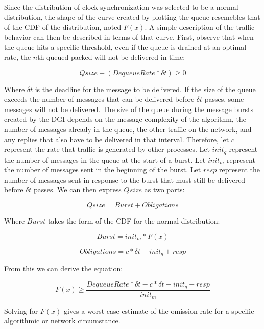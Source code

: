 Since the distribution of clock synchronization was selected to be a normal distribution, the shape of the curve created by plotting the queue resemebles that of the \ac{CDF} of the distribution, noted $F(x)$.
A simple description of the traffic behavior can then be described in terms of that curve.
First, observe that when the queue hits a specific threshold, even if the queue is drained at an optimal rate, the $n$th queued packed will not be delivered in time:

\begin{equation}
Qsize - (DequeueRate * \delta t) \geq 0
\end{equation}

Where $\delta t$ is the deadline for the message to be delivered.
If the size of the queue exceeds the number of messages that can be delivered before $\delta t$ passes, some messages will not be delivered.
The size of the queue during the message bursts created by the DGI depends on the message complexity of the algorithm, the number of messages already in the queue, the other traffic on the network, and any replies that also have to be delivered in that interval.
Therefore, let $c$ represent the rate that traffic is generated by other processes.
Let $init_q$ represent the number of messages in the queue at the start of a burst. 
Let $init_m$ represent the number of messages sent in the beginning of the burst.
Let $resp$ represent the number of messages sent in response to the burst that must still be delivered before $\delta t$ passes.
We can then express $Qsize$ as two parts:

\begin{equation}
Qsize = Burst + Obligations
\end{equation}

Where $Burst$ takes the form of the \ac{CDF} for the normal distribution:

\begin{equation}
Burst = init_m * F(x)  
\end{equation}

\begin{equation}
Obligations = c * \delta t + init_q + resp
\end{equation}

From this we can derive the equation:

\begin{equation}
F(x) \geq \frac{DequeueRate * \delta t - c * \delta t - init_q - resp}{init_m}
\end{equation}

Solving for $F(x)$ gives a worst case estimate of the omission rate for a specific algorithmic or network circumstance.
